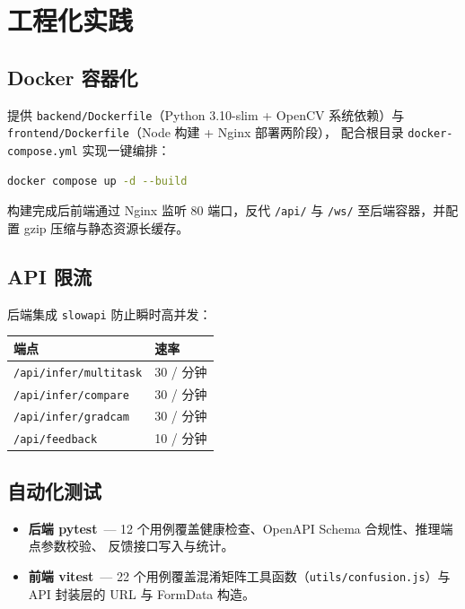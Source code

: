 \documentclass[12pt, a4paper, openany]{ctexbook}
\begin{document}
\section{工程化实践}

\subsection{Docker 容器化}

提供 \texttt{backend/Dockerfile}（Python 3.10-slim + OpenCV 系统依赖）与
\texttt{frontend/Dockerfile}（Node 构建 + Nginx 部署两阶段），
配合根目录 \texttt{docker-compose.yml} 实现一键编排：

\begin{lstlisting}[language=bash]
docker compose up -d --build
\end{lstlisting}

构建完成后前端通过 Nginx 监听 80 端口，反代 \texttt{/api/} 与 \texttt{/ws/}
至后端容器，并配置 gzip 压缩与静态资源长缓存。

\subsection{API 限流}

后端集成 \texttt{slowapi} 防止瞬时高并发：

\begin{center}
\begin{tabular}{ll}
  \toprule
  \textbf{端点} & \textbf{速率} \\
  \midrule
  \texttt{/api/infer/multitask} & 30 / 分钟 \\
  \texttt{/api/infer/compare}   & 30 / 分钟 \\
  \texttt{/api/infer/gradcam}   & 30 / 分钟 \\
  \texttt{/api/feedback}        & 10 / 分钟 \\
  \bottomrule
\end{tabular}
\end{center}

\subsection{自动化测试}

\begin{itemize}[leftmargin=*]
  \item \textbf{后端 pytest}\ —
        12 个用例覆盖健康检查、OpenAPI Schema 合规性、推理端点参数校验、
        反馈接口写入与统计。
  \item \textbf{前端 vitest}\ —
        22 个用例覆盖混淆矩阵工具函数（\texttt{utils/confusion.js}）与
        API 封装层的 URL 与 FormData 构造。
\end{itemize}
\end{document}

